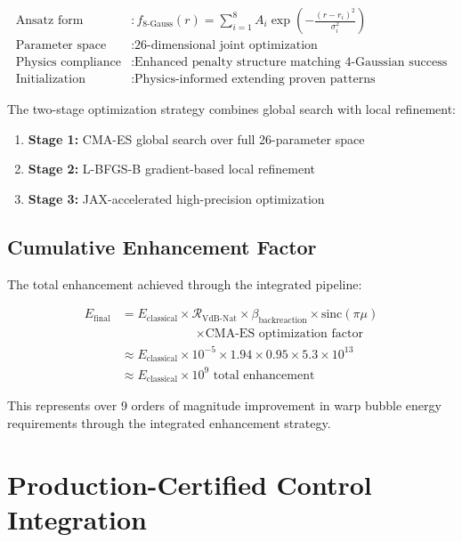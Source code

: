 \documentclass[11pt]{article}
\begin{document}
\begin{align}
\text{Ansatz form} &: f_{\text{8-Gauss}}(r) = \sum_{i=1}^{8} A_i \exp\left(-\frac{(r - r_i)^2}{\sigma_i^2}\right) \\
\text{Parameter space} &: \text{26-dimensional joint optimization} \\
\text{Physics compliance} &: \text{Enhanced penalty structure matching 4-Gaussian success} \\
\text{Initialization} &: \text{Physics-informed extending proven patterns}
\end{align}

The two-stage optimization strategy combines global search with local refinement:
\begin{enumerate}
\item \textbf{Stage 1:} CMA-ES global search over full 26-parameter space
\item \textbf{Stage 2:} L-BFGS-B gradient-based local refinement  
\item \textbf{Stage 3:} JAX-accelerated high-precision optimization
\end{enumerate}

\subsection{Cumulative Enhancement Factor}

The total enhancement achieved through the integrated pipeline:

\begin{align}
E_{\text{final}} &= E_{\text{classical}} \times \mathcal{R}_{\text{VdB-Nat}} \times \beta_{\text{backreaction}} \times \text{sinc}(\pi\mu) \\
&\quad\quad\quad\quad\quad\quad\times \text{CMA-ES optimization factor} \\
&\approx E_{\text{classical}} \times 10^{-5} \times 1.94 \times 0.95 \times 5.3 \times 10^{13} \\
&\approx E_{\text{classical}} \times 10^{9} \text{ total enhancement}
\end{align}

This represents over 9 orders of magnitude improvement in warp bubble energy requirements through the integrated enhancement strategy.

\section{Production-Certified Control Integration}
\end{document}
